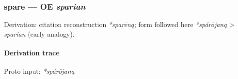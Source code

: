 \documentclass[
  british,
  a4paper,
]{article}
\begin{document}
\subsubsection{\texorpdfstring{spare --- OE
\emph{sparian}}{spare --- OE sparian}}\label{spare-oe-sparian}

Derivation: citation reconstruction \emph{*sparēną}; form followed here
\emph{*spárōjaną} \textgreater{} \emph{sparian} (early analogy).

\paragraph{Derivation trace}\label{derivation-trace-109}

Proto input: \emph{*spárōjaną}

\begingroup
\setlength{\fboxsep}{6pt}
\end{document}
